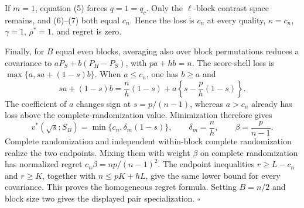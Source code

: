 If \(m=1\), equation (5) forces \(q=1=q_c\).  Only the \(\ell\)-block contrast space remains, and (6)--(7) both equal \(c_n\).  Hence the loss is \(c_n\) at every quality, \(\kappa=c_n\), \(\gamma=1\), \(\rho^*=1\), and regret is zero.

Finally, for \(B\) equal even blocks, averaging also over block permutations reduces a covariance to \(aP_S+b(P_H-P_S)\), with \(pa+hb=n\).  The score-shell loss is \(\max\{a,sa+(1-s)b\}\).  When \(a\leq c_n\), one has \(b\geq a\) and
\[
sa+(1-s)b
=\frac{n}{h}(1-s)+a\left\{s-\frac{p}{h}(1-s)\right\}.
\]
The coefficient of \(a\) changes sign at \(s=p/(n-1)\), whereas \(a>c_n\) already has loss above the complete-randomization value.  Minimization therefore gives
\[
v^*(\sqrt{s};S_B)=\min\{c_n,\delta_m(1-s)\},
\qquad
\delta_m=\frac{n}{h},
\qquad
\beta=\frac{p}{n-1}.
\tag{16}
\]
Complete randomization and independent within-block complete randomization realize the two endpoints.  Mixing them with weight \(\beta\) on complete randomization has normalized regret \(c_n\beta=np/(n-1)^2\).  The endpoint inequalities \(r\geq L-c_n\) and \(r\geq K\), together with \(n\leq pK+hL\), give the same lower bound for every covariance.  This proves the homogeneous regret formula.  Setting \(B=n/2\) and block size two gives the displayed pair specialization. \(\square\)